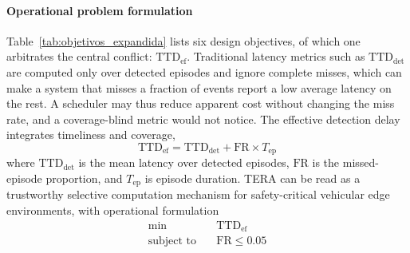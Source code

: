 \documentclass[a4paper,fleqn]{cas-dc}
\begin{document}
\paragraph{Operational problem formulation}
Table~\ref{tab:objetivos_expandida} lists six design objectives, of which one
arbitrates the central conflict: $\mathrm{TTD}_{\mathrm{ef}}$. Traditional
latency metrics such as $\mathrm{TTD}_{\mathrm{det}}$ are computed only over
detected episodes and ignore complete misses, which can make a system that
misses a fraction of events report a low average latency on the rest. A
scheduler may thus reduce apparent cost without changing the miss rate, and a
coverage-blind metric would not notice. The effective detection delay
integrates timeliness and coverage,
\begin{equation}
\mathrm{TTD}_{\mathrm{ef}}
=
\mathrm{TTD}_{\mathrm{det}}
+
\mathrm{FR}\times T_{\mathrm{ep}}
\label{eq:ttdef_sys}
\end{equation}
where $\mathrm{TTD}_{\mathrm{det}}$ is the mean latency over detected episodes,
$\mathrm{FR}$ is the missed-episode proportion, and $T_{\mathrm{ep}}$ is episode
duration. TERA can be read as a trustworthy selective computation mechanism for
safety-critical vehicular edge environments, with operational formulation
\begin{equation}
\begin{aligned}
\min \quad &
\mathrm{TTD}_{\mathrm{ef}} \\
\text{subject to} \quad &
\mathrm{FR} \le 0.05
\end{aligned}
\label{eq:tera_operational_problem}
\end{equation}
\end{document}
